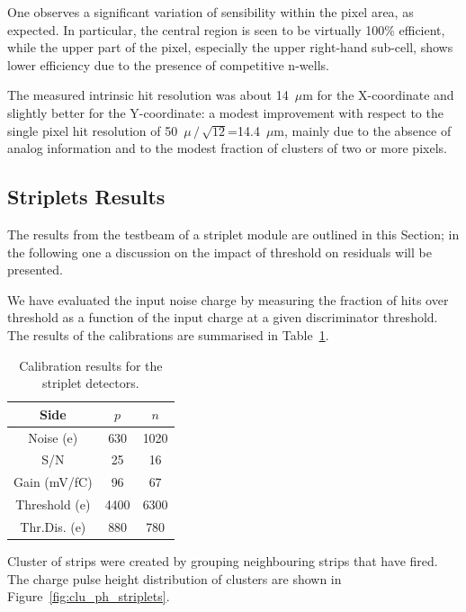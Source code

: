 One observes a significant variation of sensibility within the pixel area, as expected. In particular, the central region is seen to be virtually 100\% efficient, while the upper part of the pixel, especially the upper right-hand sub-cell, shows lower efficiency due to the presence of competitive n-wells.

The measured intrinsic hit resolution was about 14~$\mu$m for the X-coordinate and slightly better 
for the Y-coordinate: a modest improvement with respect to the single pixel hit resolution of 
50~$\mu\,/\,\sqrt{12}$=14.4~$\mu$m, mainly due 
to the absence of analog information and to the modest fraction of clusters of two or more pixels.

\subsection{Striplets Results}

The results from the testbeam of a striplet module are outlined in this Section; in the following one
a discussion on the impact of threshold on residuals will be presented.

We have evaluated the input noise charge by measuring the fraction of hits over
 threshold as a
function of the input charge at a given discriminator threshold.
The results of the calibrations are summarised in Table~\ref{tab:FSSR2Calib}.


\begin{table}[hbt]
\begin{center}
\caption{Calibration results for the striplet detectors.
\label{tab:FSSR2Calib}}
\vspace{\baselineskip}
\begin{tabular}{|c|c|c|}
\hline

Side & $p$  & $n$ \\

\hline
Noise (e)& 630       & 1020   \\
S/N      & 25        & 16         \\
Gain (mV/fC)& 96     & 67         \\
Threshold (e) & 4400 & 6300 \\
Thr.Dis. (e)& 880       & 780\\ \hline
\end{tabular}
\end{center}
\end{table}

Cluster of strips were created by grouping neighbouring strips that have fired. The charge pulse height 
distribution of clusters are shown in Figure~\ref{fig:clu_ph_striplets}.

